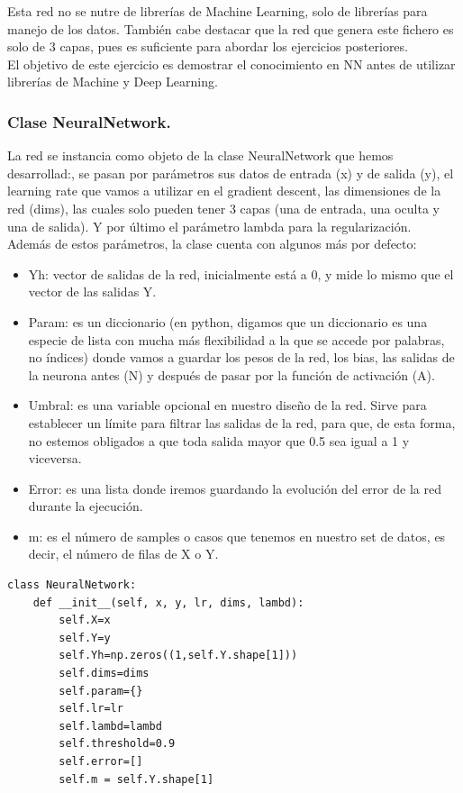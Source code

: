 \documentclass[a4paper,11pt]{article}
\begin{document}
\noindent
 Esta red no se nutre de librerías de Machine Learning, solo de librerías para manejo de los datos. También cabe destacar que la red que genera este fichero es solo de 3 capas, pues es suficiente para abordar los ejercicios posteriores.\\

\noindent
 El objetivo de este ejercicio es demostrar el conocimiento en NN antes de utilizar librerías de Machine y Deep Learning.
\subsubsection{Clase NeuralNetwork.}

La red se instancia como objeto de la clase NeuralNetwork que hemos desarrollad:, se pasan por parámetros sus datos de entrada (x) y de salida (y), el learning rate que vamos a utilizar en el gradient descent, las dimensiones de la red (dims), las cuales solo pueden tener 3 capas (una de entrada, una oculta y una de salida). Y por último el parámetro lambda para la regularización.
\\

\noindent
Además de estos parámetros, la clase cuenta con algunos más por defecto:
\begin{itemize}
    \item Yh: vector de salidas de la red, inicialmente está a 0, y mide lo mismo que el vector de las salidas Y.
    \item Param: es un diccionario (en python, digamos que un diccionario es una especie de lista con mucha más flexibilidad a la que se accede por palabras, no índices) donde vamos a guardar los pesos de la red, los bias, las salidas de la neurona antes (N) y después de pasar por la función de activación (A).
    \item Umbral: es una variable opcional en nuestro diseño de la red. Sirve para establecer un límite para filtrar las salidas de la red, para que, de esta forma, no estemos obligados a que toda salida mayor que 0.5 sea igual a 1 y viceversa.
    \item Error: es una lista donde iremos guardando la evolución del error de la red durante la ejecución.
    \item m: es el número de samples o casos que tenemos en nuestro set de datos, es decir, el número de filas de X o Y.
\end{itemize}
\begin{lstlisting}
class NeuralNetwork:
    def __init__(self, x, y, lr, dims, lambd):
        self.X=x
        self.Y=y
        self.Yh=np.zeros((1,self.Y.shape[1]))
        self.dims=dims
        self.param={}
        self.lr=lr
        self.lambd=lambd
        self.threshold=0.9
        self.error=[]
        self.m = self.Y.shape[1]
\end{lstlisting}
\end{document}
